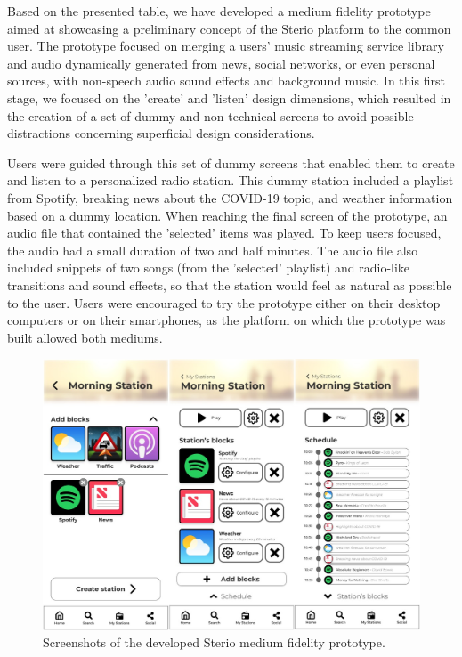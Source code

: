 {{Based on the presented table, we have developed a medium fidelity prototype aimed at showcasing a preliminary concept of the Sterio platform to the common user. The prototype focused on merging a users' music streaming service library and audio dynamically generated from news, social networks, or even personal sources, with non-speech audio sound effects and background music. In this first stage, we focused on the 'create' and 'listen' design dimensions, which resulted in the creation of a set of dummy and non-technical screens to avoid possible distractions concerning superficial design considerations.

Users were guided through this set of dummy screens that enabled them to create and listen to a personalized radio station. This dummy station included a playlist from Spotify, breaking news about the COVID-19 topic, and weather information based on a dummy location. When reaching the final screen of the prototype, an audio file that contained the 'selected' items was played. To keep users focused, the audio had a small duration of two and half minutes. The audio file also included snippets of two songs (from the 'selected' playlist) and radio-like transitions and sound effects, so that the station would feel as natural as possible to the user. Users were encouraged to try the prototype either on their desktop computers or on their smartphones, as the platform on which the prototype was built allowed both mediums.

\begin{figure}[!h]
    \centering
    \includegraphics[width=\columnwidth]{./Images/prototype.jpg}
    \caption{Screenshots of the developed Sterio medium fidelity prototype.}
    \label{fig:persona}
\end{figure}

}}
